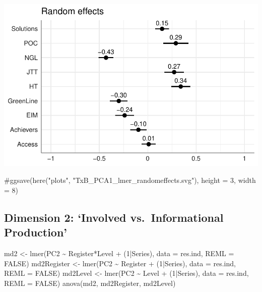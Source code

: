 \documentclass[
  letterpaper,
  DIV=11,
  numbers=noendperiod]{scrreprt}
\newenvironment{Shaded}{\begin{snugshade}}{\end{snugshade}}
\newcommand{\AttributeTok}[1]{\textcolor[rgb]{0.40,0.45,0.13}{#1}}
\newcommand{\CommentTok}[1]{\textcolor[rgb]{0.37,0.37,0.37}{#1}}
\newcommand{\ConstantTok}[1]{\textcolor[rgb]{0.56,0.35,0.01}{#1}}
\newcommand{\DecValTok}[1]{\textcolor[rgb]{0.68,0.00,0.00}{#1}}
\newcommand{\FunctionTok}[1]{\textcolor[rgb]{0.28,0.35,0.67}{#1}}
\newcommand{\NormalTok}[1]{\textcolor[rgb]{0.00,0.23,0.31}{#1}}
\newcommand{\OtherTok}[1]{\textcolor[rgb]{0.00,0.23,0.31}{#1}}
\newcommand{\SpecialCharTok}[1]{\textcolor[rgb]{0.37,0.37,0.37}{#1}}
\begin{document}
\includegraphics{E_Ch6_Analysis_files/figure-pdf/Dim1random-1.pdf}

\begin{Shaded}
\begin{Highlighting}[]
\CommentTok{\#ggsave(here("plots", "TxB\_PCA1\_lmer\_randomeffects.svg"), height = 3, width = 8)}
\end{Highlighting}
\end{Shaded}

\subsection{Dimension 2: `Involved vs.~Informational
Production'}\label{dimension-2-involved-vs.-informational-production}

\begin{Shaded}
\begin{Highlighting}[]
\NormalTok{md2 }\OtherTok{\textless{}{-}} \FunctionTok{lmer}\NormalTok{(PC2 }\SpecialCharTok{\textasciitilde{}}\NormalTok{ Register}\SpecialCharTok{*}\NormalTok{Level }\SpecialCharTok{+}\NormalTok{ (}\DecValTok{1}\SpecialCharTok{|}\NormalTok{Series), }\AttributeTok{data =}\NormalTok{ res.ind, }\AttributeTok{REML =} \ConstantTok{FALSE}\NormalTok{)}
\NormalTok{md2Register }\OtherTok{\textless{}{-}} \FunctionTok{lmer}\NormalTok{(PC2 }\SpecialCharTok{\textasciitilde{}}\NormalTok{ Register }\SpecialCharTok{+}\NormalTok{ (}\DecValTok{1}\SpecialCharTok{|}\NormalTok{Series), }\AttributeTok{data =}\NormalTok{ res.ind, }\AttributeTok{REML =} \ConstantTok{FALSE}\NormalTok{)}
\NormalTok{md2Level }\OtherTok{\textless{}{-}} \FunctionTok{lmer}\NormalTok{(PC2 }\SpecialCharTok{\textasciitilde{}}\NormalTok{ Level }\SpecialCharTok{+}\NormalTok{ (}\DecValTok{1}\SpecialCharTok{|}\NormalTok{Series), }\AttributeTok{data =}\NormalTok{ res.ind, }\AttributeTok{REML =} \ConstantTok{FALSE}\NormalTok{)}
\FunctionTok{anova}\NormalTok{(md2, md2Register, md2Level)}
\end{Highlighting}
\end{Shaded}
\end{document}
